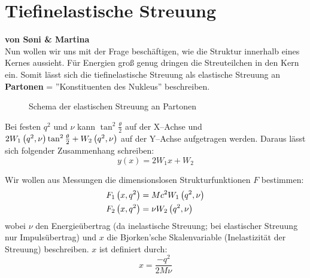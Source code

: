 \documentclass[Ex4_Zusammenfassung.tex]{subfiles}
\begin{document}
\section{Tiefinelastische Streuung}
\textbf{von S\o{}ni \& Martina}\\

Nun wollen wir uns mit der Frage beschäftigen, wie die Struktur innerhalb eines Kernes aussieht. Für Energien groß genug dringen die Streuteilchen in den Kern ein. Somit lässt sich die tiefinelastische Streuung als elastische Streuung an \textbf{Partonen} = ''Konstituenten des Nukleus'' beschreiben.
\begin{figure}[H]
	\centering
	\caption{Schema der elastischen Streuung an Partonen}
\end{figure}

Bei festen $q^2$ und $\nu$ kann $\tan^2 \frac{\theta}{2}$ auf der X--Achse und $2W_1\left( q^2,\nu\right) \tan^2 \frac{\theta}{2} + W_2\left( q^2,\nu\right)$ auf der Y--Achse aufgetragen werden. Daraus lässt sich folgender Zusammenhang schreiben:
\begin{equation}
	y(x) = 2W_1x+W_2
\end{equation}

Wir wollen aus Messungen die dimensionslosen Strukturfunktionen $F$ bestimmen:
\begin{align}
	F_1\left( x,q^2\right) &= Mc^2 W_1\left( q^2,\nu\right)\\
	F_2\left( x,q^2\right) &= \nu W_2\left( q^2,\nu\right)
\end{align}
wobei $\nu$ den Energieübertrag (da inelastische Streuung; bei elastischer Streuung nur Impulsübertrag) und $x$ die Bjorken'sche Skalenvariable (Inelastizität der Streuung) beschreiben. $x$ ist definiert durch:
\begin{equation}
	x = \frac{-q^2}{2M\nu}
\end{equation}
\end{document}
